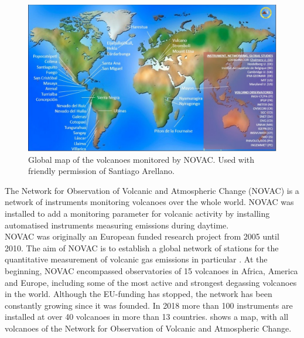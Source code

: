 


		\begin{figure}[h]
			\centering
			\includegraphics[width=0.8\linewidth]{Bilder/NOVAC2015}
			\caption{Global map of the volcanoes monitored by NOVAC. Used with friendly permission of Santiago Arellano.}
			\label{fig:novac2015}
		\end{figure}
		The Network for Observation of Volcanic and Atmospheric Change (NOVAC) is a network of instruments monitoring volcanoes over the whole world. 
		NOVAC was installed to add a monitoring parameter for volcanic activity by installing automatised instruments measuring  emissions during daytime.\\
		NOVAC was originally an European funded research project from 2005 until 2010. The aim of NOVAC is to  establish  a  global  
		network  of  stations  for  the  quantitative  measurement  of  volcanic gas  emissions in particular . At the beginning, NOVAC encompassed observatories of 15 volcanoes in Africa, America and Europe, including some of the most active and strongest degassing volcanoes in the world. Although the EU-funding has stopped, the network has been constantly growing since it was founded. In 2018 more than 100 instruments are installed at over 40 volcanoes in more than 13 countries.
		 shows a map, with all volcanoes of the Network for Observation of Volcanic and Atmospheric Change.\\
		
